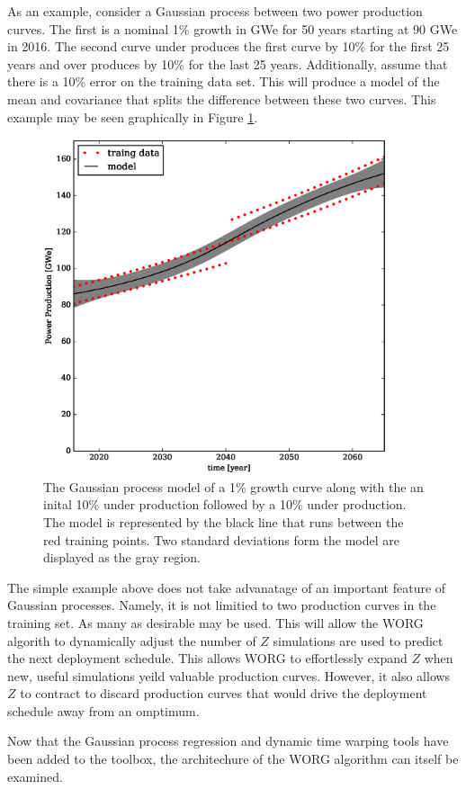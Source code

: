 As an example, consider a Gaussian process between two power production 
curves. The first is a nominal 1\% growth in GWe for 50 years starting at 
90 GWe in 2016. The second curve under produces the first curve by 10\% 
for the first 25 years and over produces by 10\% for the last 25 years.
Additionally, assume that there is a 10\% error on the training data set.
This will produce a model of the mean and covariance that splits the 
difference between these two curves. This example may be seen graphically
in Figure \ref{gwe-model-}.

\begin{figure}[htb]
\centering
\includegraphics[width=0.9\textwidth]{gwe-model-.eps}
\caption{The Gaussian process model of a 1\% growth curve along with the
an inital 10\% under production followed by a 10\% under production. 
The model is represented by the black line that runs between the red 
training points. Two standard deviations form the model are displayed as the
gray region.}
\label{gwe-model-}
\end{figure}

The simple example above does not take advanatage of an important 
feature of Gaussian processes. Namely, it is not limitied to two production
curves in the training set.  As many as desirable may be used.  This will
allow the WORG algorith to dynamically adjust the number of $Z$ simulations 
are used to predict the next deployment schedule. This allows WORG to 
effortlessly expand $Z$ when new, useful simulations yeild valuable production
curves.  However, it also allows $Z$ to contract to discard production
curves that would drive the deployment schedule away from an omptimum.

Now that the Gaussian process regression and dynamic time warping tools have 
been added to the toolbox, the architechure of the WORG algorithm can 
itself be examined.

\clearpage